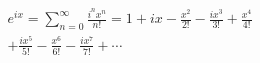 \documentclass[preview]{standalone}
\begin{document}
\begin{align*}
e^{ix} = \sum_{n=0}^{\infty} \frac{i^nx^n}{n!} = 1 + ix - \frac{x^2}{2!} - \frac{ix^3}{3!} + \frac{x^4}{4!} \\ + \frac{ix^5}{5!} - \frac{x^6}{6!} - \frac{ix^7}{7!} + \cdots
\end{align*}
\end{document}
